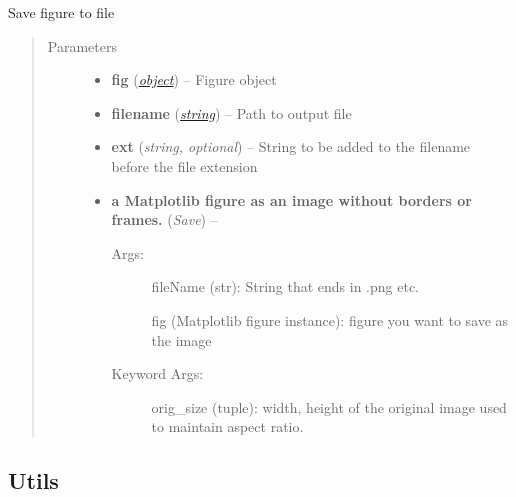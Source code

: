 \documentclass[letterpaper,10pt,english]{sphinxmanual}
\begin{document}
\begin{fulllineitems}
\label{classification:flamingo.classification.plot.save_figure}
Save figure to file
\begin{quote}\begin{description}
\item[{Parameters}] \leavevmode\begin{itemize}
\item {} 
\textbf{fig} (\href{http://docs.python.org/library/functions.html\#object}{\emph{object}}) -- Figure object

\item {} 
\textbf{filename} (\href{http://docs.python.org/library/string.html\#module-string}{\emph{string}}) -- Path to output file

\item {} 
\textbf{ext} (\emph{string, optional}) -- String to be added to the filename before the file extension

\item {} 
\textbf{a Matplotlib figure as an image without borders or frames.} (\emph{Save}) -- \begin{description}
\item[{Args:}] \leavevmode
fileName (str): String that ends in .png etc.

fig (Matplotlib figure instance): figure you want to save as the image

\item[{Keyword Args:}] \leavevmode
orig\_size (tuple): width, height of the original image used to maintain
aspect ratio.

\end{description}


\end{itemize}

\end{description}\end{quote}

\end{fulllineitems}



\subsection{Utils}
\label{classification:module-flamingo.classification.utils}\label{classification:utils}
\end{document}
